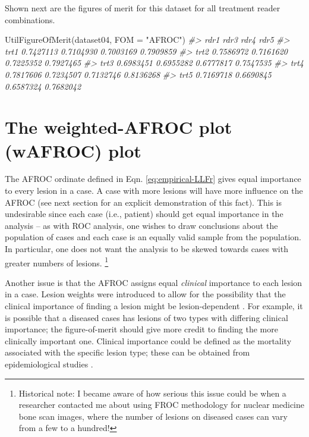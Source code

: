 \documentclass[
]{book}
\newenvironment{Shaded}{\begin{snugshade}}{\end{snugshade}}
\newcommand{\AttributeTok}[1]{\textcolor[rgb]{0.77,0.63,0.00}{#1}}
\newcommand{\CommentTok}[1]{\textcolor[rgb]{0.56,0.35,0.01}{\textit{#1}}}
\newcommand{\FunctionTok}[1]{\textcolor[rgb]{0.00,0.00,0.00}{#1}}
\newcommand{\NormalTok}[1]{#1}
\newcommand{\StringTok}[1]{\textcolor[rgb]{0.31,0.60,0.02}{#1}}
\begin{document}
Shown next are the figures of merit for this dataset for all treatment reader combinations.

\begin{Shaded}
\begin{Highlighting}[]
\FunctionTok{UtilFigureOfMerit}\NormalTok{(dataset04, }\AttributeTok{FOM =} \StringTok{"AFROC"}\NormalTok{)}
\CommentTok{\#\textgreater{}           rdr1      rdr3      rdr4      rdr5}
\CommentTok{\#\textgreater{} trt1 0.7427113 0.7104930 0.7003169 0.7909859}
\CommentTok{\#\textgreater{} trt2 0.7586972 0.7161620 0.7225352 0.7927465}
\CommentTok{\#\textgreater{} trt3 0.6983451 0.6955282 0.6777817 0.7547535}
\CommentTok{\#\textgreater{} trt4 0.7817606 0.7234507 0.7132746 0.8136268}
\CommentTok{\#\textgreater{} trt5 0.7169718 0.6690845 0.6587324 0.7682042}
\end{Highlighting}
\end{Shaded}

\hypertarget{empirical-wAFROC}{%
\section{The weighted-AFROC plot (wAFROC) plot}\label{empirical-wAFROC}}

The AFROC ordinate defined in Eqn. \eqref{eq:empirical-LLFr} gives equal importance to every lesion in a case. A case with more lesions will have more influence on the AFROC (see next section for an explicit demonstration of this fact). This is undesirable since each case (i.e., patient) should get equal importance in the analysis -- as with ROC analysis, one wishes to draw conclusions about the population of cases and each case is an equally valid sample from the population. In particular, one does not want the analysis to be skewed towards cases with greater numbers of lesions. \footnote{Historical note: I became aware of how serious this issue could be when a researcher contacted me about using FROC methodology for nuclear medicine bone scan images, where the number of lesions on diseased cases can vary from a few to a hundred!}

Another issue is that the AFROC assigns equal \emph{clinical} importance to each lesion in a case. Lesion weights were introduced \citep{RN1385} to allow for the possibility that the clinical importance of finding a lesion might be lesion-dependent \citep{RN1966}. For example, it is possible that a diseased cases has lesions of two types with differing clinical importance; the figure-of-merit should give more credit to finding the more clinically important one. Clinical importance could be defined as the mortality associated with the specific lesion type; these can be obtained from epidemiological studies \citep{desantis2011breast}.
\end{document}
